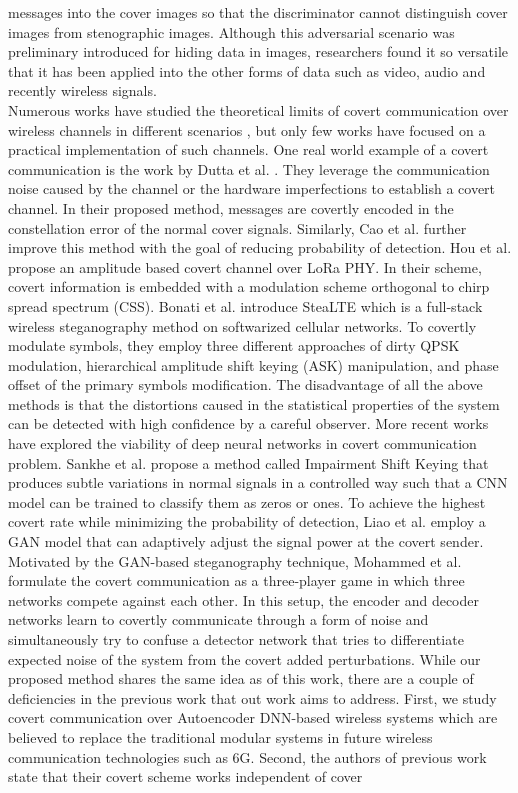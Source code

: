messages into the cover images so that the discriminator cannot distinguish cover images from stenographic images. Although this adversarial scenario was preliminary introduced for hiding data in images, researchers found it so versatile that it has been applied into the other forms of data such as video, audio and recently wireless signals.\\
Numerous works have studied the theoretical limits of covert communication over wireless channels in different scenarios \cite{bash2012square, soltani2018covert, sheikholeslami2018multi, li2021fundamental}, but only few works have focused on a practical implementation of such channels. One real world example of a covert communication is the work by Dutta et al. \cite{dutta2012secret}. They leverage the communication noise caused by the channel or the hardware imperfections to establish a covert channel. In their proposed method, messages are covertly encoded in the constellation error of the normal cover signals. Similarly, Cao et al. \cite{cao2018wireless} further improve this method with the goal of reducing probability of detection. Hou et al. \cite{hou2020cloaklora} propose an amplitude based covert channel over LoRa PHY. In their scheme, covert information is embedded with a modulation scheme orthogonal to chirp spread spectrum (CSS). Bonati et al. \cite{bonati2021stealte} introduce SteaLTE which is a full-stack wireless steganography method on softwarized cellular networks. To covertly modulate symbols, they employ three different approaches of dirty QPSK modulation, hierarchical amplitude shift keying (ASK) manipulation, and phase offset of the primary symbols modification. The disadvantage of all the above methods is that the distortions caused in the statistical properties of the system can be detected with high confidence by a careful observer. More recent works have explored the viability of deep neural networks in covert communication problem. Sankhe et al. \cite{sankhe2019impairment} propose a method called Impairment Shift Keying that produces subtle variations in normal signals in a controlled way such that a CNN model can be trained to classify them as zeros or ones. To achieve the highest covert rate while minimizing the probability of detection, Liao et al. \cite{liao2020generative} employ a GAN model that can adaptively adjust the signal power at the covert sender. Motivated by the GAN-based steganography technique, Mohammed et al. \cite{mohammed2021adversarial} formulate the covert communication as a three-player game in which three networks compete against each other. In this setup, the encoder and decoder networks learn to covertly communicate through a form of noise and simultaneously try to confuse a detector network that tries to differentiate expected noise of the system from the covert added perturbations. While our proposed method shares the same idea as of this work, there are a couple of deficiencies in the previous work that out work aims to address. First, we study covert communication over Autoencoder DNN-based wireless systems which are believed to replace the traditional modular systems in future wireless communication technologies such as 6G. Second, the authors of previous work state that their covert scheme works independent of cover 
